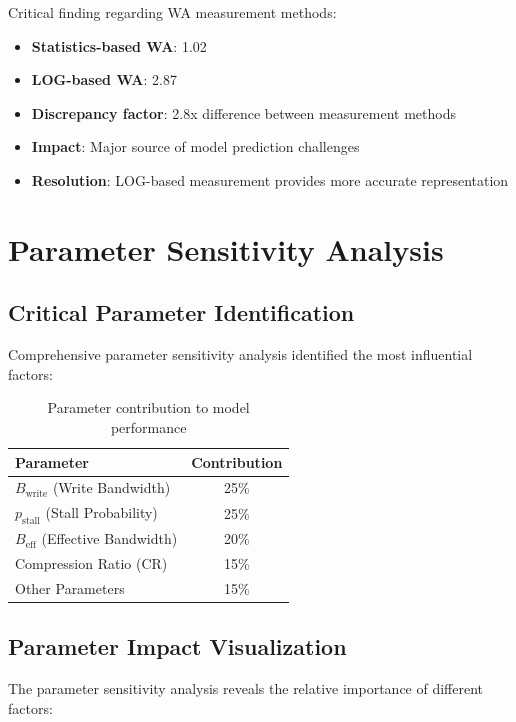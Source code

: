 \documentclass[11pt,twocolumn]{article}
\newcommand{\pstall}{p_{\text{stall}}}
\begin{document}
Critical finding regarding WA measurement methods:
\begin{itemize}
    \item \textbf{Statistics-based WA}: 1.02
    \item \textbf{LOG-based WA}: 2.87
    \item \textbf{Discrepancy factor}: 2.8x difference between measurement methods
    \item \textbf{Impact}: Major source of model prediction challenges
    \item \textbf{Resolution}: LOG-based measurement provides more accurate representation
\end{itemize}

\section{Parameter Sensitivity Analysis}

\subsection{Critical Parameter Identification}

Comprehensive parameter sensitivity analysis identified the most influential factors:

\begin{table}[H]
\centering
\begin{tabular}{@{}lc@{}}
\toprule
\textbf{Parameter} & \textbf{Contribution} \\
\midrule
$B_{\text{write}}$ (Write Bandwidth) & 25\% \\
$\pstall$ (Stall Probability) & 25\% \\
$B_{\text{eff}}$ (Effective Bandwidth) & 20\% \\
Compression Ratio (CR) & 15\% \\
Other Parameters & 15\% \\
\bottomrule
\end{tabular}
\caption{Parameter contribution to model performance}
\label{tab:parameter_contribution}
\end{table}

\subsection{Parameter Impact Visualization}

The parameter sensitivity analysis reveals the relative importance of different factors:
\end{document}
